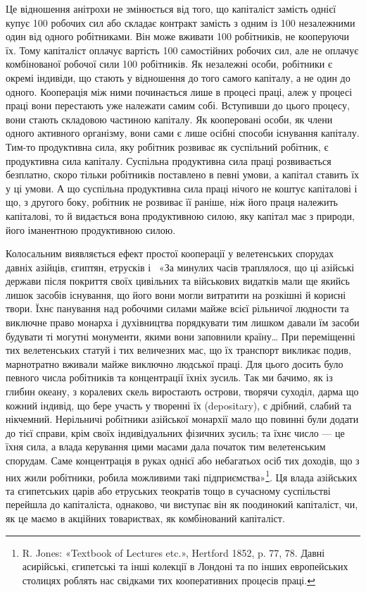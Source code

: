 \parcont{}  %
Це відношення анітрохи не змінюється від того, що капіталіст
замість однієї купує 100 робочих сил або складає контракт замість
з одним із 100 незалежними один від одного робітниками. Він може
вживати 100 робітників, не кооперуючи їх. Тому капіталіст
оплачує вартість 100 самостійних робочих сил, але не оплачує
комбінованої робочої сили 100 робітників. Як незалежні особи,
робітники є окремі індивіди, що стають у відношення до того
самого капіталу, а не один до одного. Кооперація між ними починається
лише в процесі праці, алеж у процесі праці вони перестають
уже належати самим собі. Вступивши до цього процесу,
вони стають складовою частиною капіталу. Як кооперовані
особи, як члени одного активного організму, вони сами є лише
осібні способи існування капіталу. Тим-то продуктивна сила,
яку робітник розвиває як суспільний робітник, є продуктивна
сила капіталу. Суспільна продуктивна сила праці розвивається
безплатно, скоро тільки робітників поставлено в певні умови,
а капітал ставить їх у ці умови. А що суспільна продуктивна
сила праці нічого не коштує капіталові і що, з другого боку, робітник
не розвиває її раніше, ніж його праця належить капіталові,
то й видається вона продуктивною силою, яку капітал має з
природи, його іманентною продуктивною силою.

Колосальним виявляється ефект простої кооперації у велетенських
спорудах давніх азійців, єгиптян, етрусків і~
«За минулих часів траплялося, що ці азійські держави після
покриття своїх цивільних та військових видатків мали ще якийсь
лишок засобів існування, що його вони могли витратити на розкішні
й корисні твори. Їхнє панування над робочими силами майже
всієї рільничої людности та виключне право монарха і духівництва
порядкувати тим лишком давали їм засоби будувати ті
могутні монументи, якими вони заповнили країну\dots{} При переміщенні
тих велетенських статуй і тих величезних мас, що їх
транспорт викликає подив, марнотратно вживали майже виключно
людської праці. Для цього досить було певного числа робітників
та концентрації їхніх зусиль. Так ми бачимо, як із глибин океану,
з коралевих скель виростають острови, творячи суходіл, дарма
що кожний індивід, що бере участь у творенні їх (depositary),
є дрібний, слабий та нікчемний. Нерільничі робітники азійської
монархії мало що повинні були додати до тієї справи, крім
своїх індивідуальних фізичних зусиль; та їхнє число — це їхня
сила, а влада керування цими масами дала початок тим велетенським
спорудам. Саме концентрація в руках однієї або небагатьох
осіб тих доходів, що з них жили робітники, робила можливими
такі підприємства»\footnote{
R. Jones: «Textbook of Lectures etc.», Hertford 1852, p. 77, 78.
Давні асирійські, єгипетські та інші колекції в Лондоні та по інших
европейських столицях роблять нас свідками тих кооперативних процесів
праці.
}. Ця влада азійських та єгипетських царів
або етруських теократів тощо в сучасному суспільстві перейшла
до капіталіста, однаково, чи виступає він як поодинокий капіталіст,
чи, як це маємо в акційних товариствах, як комбінований
капіталіст.


